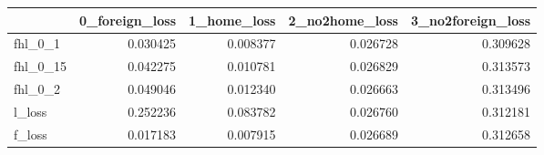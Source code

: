 \begin{tabular}{lrrrr}
\toprule
 & 0_foreign_loss & 1_home_loss & 2_no2home_loss & 3_no2foreign_loss \\
\midrule
fhl_0_1 & 0.030425 & 0.008377 & 0.026728 & 0.309628 \\
fhl_0_15 & 0.042275 & 0.010781 & 0.026829 & 0.313573 \\
fhl_0_2 & 0.049046 & 0.012340 & 0.026663 & 0.313496 \\
l_loss & 0.252236 & 0.083782 & 0.026760 & 0.312181 \\
f_loss & 0.017183 & 0.007915 & 0.026689 & 0.312658 \\
\bottomrule
\end{tabular}
